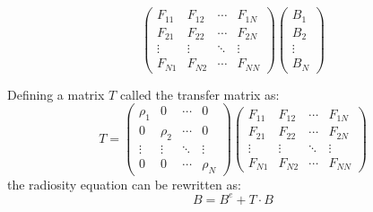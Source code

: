 \begin{enumerate}
\begin{equation*}
\begin{pmatrix}
            F_{11} & F_{12} & \cdots & F_{1N} \\
            F_{21} & F_{22} & \cdots & F_{2N} \\
            \vdots & \vdots & \ddots & \vdots \\
            F_{N1} & F_{N2} & \cdots & F_{NN}
        \end{pmatrix}
        \begin{pmatrix}
            B_1 \\
            B_2 \\
            \vdots \\
            B_N
        \end{pmatrix}
    \end{equation*}

    Defining a matrix $T$ called the transfer matrix as:
    \begin{equation*}
        T = \begin{pmatrix}
            \rho_1 & 0 & \cdots & 0 \\
            0 & \rho_2 & \cdots & 0 \\
            \vdots & \vdots & \ddots & \vdots \\
            0 & 0 & \cdots & \rho_N
        \end{pmatrix}
        \begin{pmatrix}
            F_{11} & F_{12} & \cdots & F_{1N} \\
            F_{21} & F_{22} & \cdots & F_{2N} \\
            \vdots & \vdots & \ddots & \vdots \\
            F_{N1} & F_{N2} & \cdots & F_{NN}
        \end{pmatrix}
    \end{equation*}
    the radiosity equation can be rewritten as:
    \begin{equation*}
        B = B^e + T \cdot B
    \end{equation*}


\end{enumerate}
